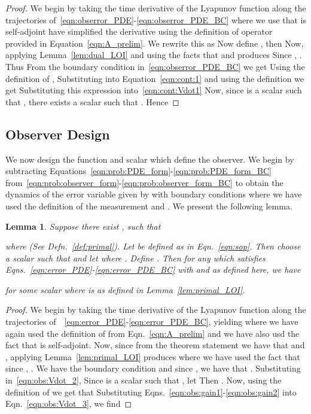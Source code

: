 \documentclass[US letter, 9 pt, conference]{ieeeconf}  \usepackage{setspace}
\newtheorem{lemma}{Lemma}
\begin{document}
\begin{proof}
We begin by taking the time derivative of the Lyapunov function  along the trajectories of~\eqref{eqn:obserror_PDE}-\eqref{eqn:obserror_PDE_BC}
 where we use that  is self-adjoint have simplified the derivative using the definition of operator  provided in Equation~\eqref{eqn:A_prelim}. We rewrite this as
 Now define , then
 Now, applying Lemma~\ref{lem:dual_LOI} and using the facts that  and  produces
 Since , . Thus
 From the boundary condition in~\eqref{eqn:obserror_PDE_BC} we get
 Using the definition of ,
 Substituting into Equation~\eqref{eqn:cont:1} and using the definition  we get
 Substituting this expression into~\eqref{eqn:cont:Vdot1}
 Now, since  is a scalar such that , there exists a scalar  such that . Hence

\end{proof}
\subsection{Observer Design}

We now design the function  and scalar  which define the observer.
We begin by subtracting Equations~\eqref{eqn:prob:PDE_form}-\eqref{eqn:prob:PDE_form_BC} from~\eqref{eqn:prob:observer_form}-\eqref{eqn:prob:observer_form_BC} to obtain the dynamics of the error variable  given by
 with boundary conditions
 where we have used the definition of the measurement  and . We present the following lemma.
\begin{lemma}\label{lem:observer}
Suppose there exist , such that

where  (See Defn.~\ref{def:primal}).
Let  be defined as in Eqn.~\eqref{eqn:sop}. Then choose a scalar  such that
 and let  where .
Define . Then for any  which satisfies Eqns.~\eqref{eqn:error_PDE}-\eqref{eqn:error_PDE_BC} with  and  as defined here, we have

for some scalar  where  is as defined in Lemma~\ref{lem:primal_LOI}.
\end{lemma}

\begin{proof}
We begin by taking the time derivative of the Lyapunov function  along the trajectories of~~\eqref{eqn:error_PDE}-\eqref{eqn:error_PDE_BC}, yielding
 where we have again used the definition of  from Eqn.~\eqref{eqn:A_prelim} and we have also usd the fact that  is self-adjoint. Now, since from the theorem statement we have that  and , applying Lemma~\ref{lem:primal_LOI} produces
 where we have used the fact that since , . We have the boundary condition  and since , we have that . Substituting in~\eqref{eqn:obs:Vdot_2},
 Since  is a scalar such that , let
 Then . Now, using the definition of  we get that
 Substituting Eqns.~\eqref{eqn:obs:gain1}-\eqref{eqn:obs:gain2} into Eqn.~\eqref{eqn:obs:Vdot_3}, we find

\end{proof}
\end{document}
